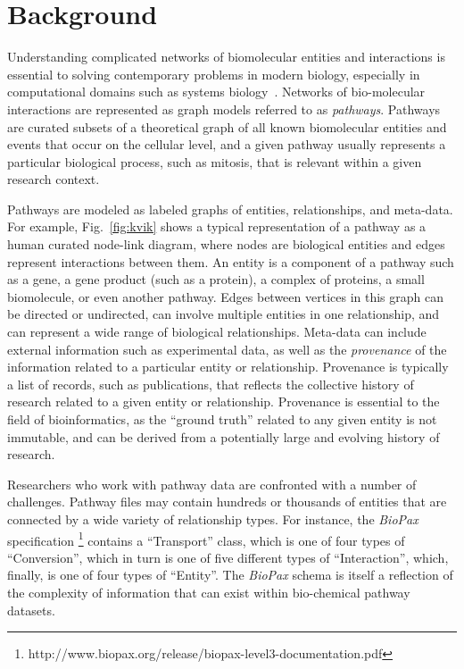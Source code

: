 \documentclass[twocolumn]{bmcart}%
\begin{document}
\section*{Background}

Understanding complicated networks of biomolecular entities and interactions is essential to solving contemporary problems in modern biology, especially in computational domains such as systems biology~\cite{hanahan2011hallmarks}.
Networks of bio-molecular interactions are represented as graph models referred to as \emph{pathways}.
Pathways are curated subsets of a theoretical graph of all known biomolecular entities and events that occur on the cellular level, and a given pathway usually represents a particular biological process, such as mitosis, that is relevant within a given research context.

Pathways are modeled as labeled graphs of entities, relationships, and meta-data. For example, Fig.~\ref{fig:kvik} shows a typical representation of a pathway as a human curated node-link diagram, where nodes are biological entities and edges represent interactions between them.
An entity is a component of a pathway such as a gene, a gene product (such as a protein), a complex of proteins, a small biomolecule, or even another pathway.
Edges between vertices in this graph can be directed or undirected, can involve multiple entities in one relationship, and can represent a wide range of biological relationships.
Meta-data can include external information such as experimental data, as well as the \emph{provenance} of the information related to a particular entity or relationship.
Provenance is typically a list of records, such as publications, that reflects the collective history of research related to a given entity or relationship.
Provenance is essential to the field of bioinformatics, as the ``ground truth'' related to any given entity is not immutable, and can be derived from a potentially large and evolving history of research.


Researchers who work with pathway data are confronted with a number of challenges.
Pathway files may contain hundreds or thousands of entities that are connected by a wide variety of relationship types.
For instance, the \emph{BioPax} specification \footnote{http://www.biopax.org/release/biopax-level3-documentation.pdf} contains a ``Transport'' class, which is one of four types of ``Conversion'', which in turn is one of five different types of ``Interaction'', which, finally, is one of four types of ``Entity''.
The \emph{BioPax} schema is itself a reflection of the complexity of information that can exist within bio-chemical pathway datasets.
\end{document}

